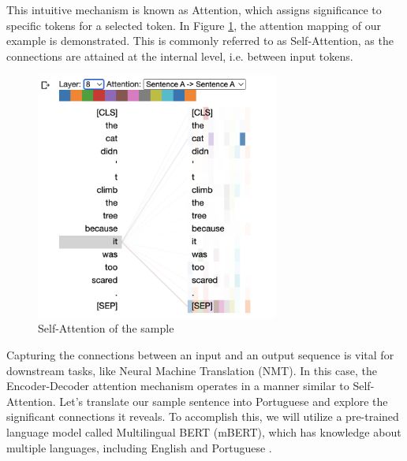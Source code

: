 This intuitive mechanism is known as Attention, which assigns significance to specific tokens for a selected token. In Figure \ref{fig:att_self_sample}, the attention mapping of our example is demonstrated. This is commonly referred to as Self-Attention, as the connections are attained at the internal level, i.e. between input tokens.

\begin{figure}[h]
    \centering
    \includegraphics[width=8cm]{pages/imgs/att_self_sample.png}
    \caption{Self-Attention of the sample}
    \label{fig:att_self_sample}
\end{figure}

Capturing the connections between an input and an output sequence is vital for downstream tasks, like Neural Machine Translation (NMT). In this case, the Encoder-Decoder attention mechanism operates in a manner similar to Self-Attention. Let's translate our sample sentence into Portuguese and explore the significant connections it reveals. To accomplish this, we will utilize a pre-trained language model called Multilingual BERT (mBERT), which has knowledge about multiple languages, including English and Portuguese \citep{devlin2018bert}.


